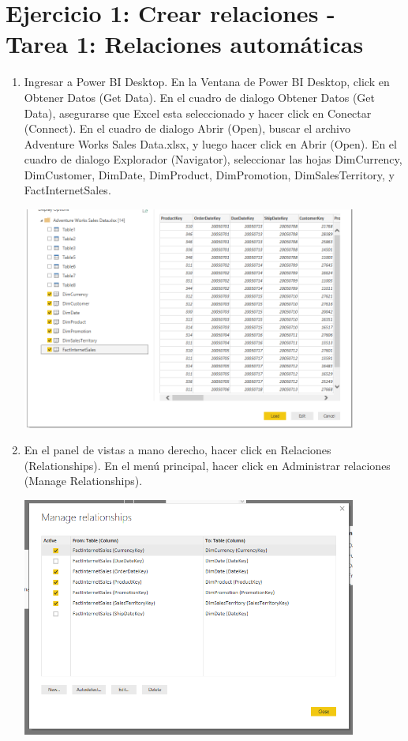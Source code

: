 \section{Ejercicio 1: Crear relaciones - Tarea 1: Relaciones automáticas} 



\begin{enumerate}[1.]
	\item  Ingresar a Power BI Desktop. En la Ventana de Power BI Desktop, click en Obtener Datos (Get Data). En el cuadro de dialogo Obtener Datos (Get Data), asegurarse que Excel esta seleccionado y hacer click en Conectar (Connect).
	En el cuadro de dialogo Abrir (Open), buscar el archivo Adventure Works Sales Data.xlsx, y luego hacer
click en Abrir (Open).	 En el cuadro de dialogo Explorador (Navigator), seleccionar las hojas DimCurrency, DimCustomer,
DimDate, DimProduct, DimPromotion, DimSalesTerritory, y FactInternetSales.
	
	

	\begin{center}
	\includegraphics[width=11cm]{./Imagenes/11} 
	\end{center}


	\item   En el panel de vistas a mano derecho, hacer click en Relaciones (Relationships).
 En el menú principal, hacer click en Administrar relaciones (Manage Relationships).

	\begin{center}
	\includegraphics[width=11cm]{./Imagenes/12} 
	\end{center}




\end{enumerate}
